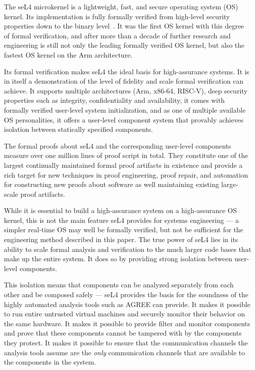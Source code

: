 
The seL4 microkernel is a lightweight, fast, and secure operating system (OS) kernel.
Its implementation is fully formally verified from high-level security properties
down to the binary level~\cite{sel4-formal}. It was the first OS kernel with this
degree of formal verification, and after more than a decade of further research
and engineering is still not only the leading formally verified OS kernel, but also
the fastest OS kernel on the Arm architecture.

Its formal verification makes seL4 the ideal basis for high-assurance systems.
It is in itself a demonstration of the level of fidelity and scale formal
verification can achieve. It supports multiple architectures (Arm, x86-64,
RISC-V), deep security properties such as integrity, confidentiality and
availability, it comes with formally verified user-level system initialization,
and as one of multiple available OS personalities, it offers a user-level component
system that provably achieves isolation between statically specified components.

The formal proofs about seL4 and the corresponding user-level components measure
over one million lines of proof script in total. They constitute one of the
largest continually maintained formal proof artifacts in existence and provide a
rich target for new techniques in proof engineering, proof repair, and
automation for constructing new proofs about software as well maintaining
existing large-scale proof artifacts.

While it is essential to build a high-assurance system on a high-assurance OS
kernel, this is not the main feature seL4 provides for systems engineering --- a
simpler real-time OS may well be formally verified, but not be sufficient for the
engineering method described in this paper. The true power of seL4 lies in its
ability to scale formal analysis and verification to the much larger code bases
that make up the entire system. It does so by providing strong isolation between
user-level components.

This isolation means that components can be analyzed separately from each other
and be composed safely --- seL4 provides the basis for the soundness of the highly
automated analysis tools such as AGREE can provide. It makes it possible to run
entire untrusted virtual machines and securely monitor their behavior on the
same hardware. It makes it possible to provide filter and monitor components and
prove that these components cannot be tampered with by the components they protect.
It makes it possible to ensure that the communication channels the analysis tools
assume are the \emph{only} communication channels that are available to the
components in the system.
